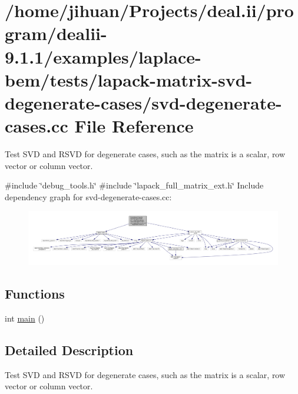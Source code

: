 \hypertarget{svd-degenerate-cases_8cc}{}\section{/home/jihuan/\+Projects/deal.ii/program/dealii-\/9.1.1/examples/laplace-\/bem/tests/lapack-\/matrix-\/svd-\/degenerate-\/cases/svd-\/degenerate-\/cases.cc File Reference}
\label{svd-degenerate-cases_8cc}


Test S\+VD and R\+S\+VD for degenerate cases, such as the matrix is a scalar, row vector or column vector.  


{\ttfamily \#include \char`\"{}debug\+\_\+tools.\+h\char`\"{}}\newline
{\ttfamily \#include \char`\"{}lapack\+\_\+full\+\_\+matrix\+\_\+ext.\+h\char`\"{}}\newline
Include dependency graph for svd-\/degenerate-\/cases.cc\+:
\nopagebreak
\begin{figure}[H]
\begin{center}
\leavevmode
\includegraphics[width=350pt]{svd-degenerate-cases_8cc__incl}
\end{center}
\end{figure}
\subsection*{Functions}
\begin{DoxyCompactItemize}
\item 
int \hyperlink{svd-degenerate-cases_8cc_ae66f6b31b5ad750f1fe042a706a4e3d4}{main} ()
\end{DoxyCompactItemize}


\subsection{Detailed Description}
Test S\+VD and R\+S\+VD for degenerate cases, such as the matrix is a scalar, row vector or column vector. 

